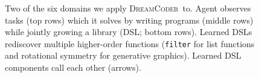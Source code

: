 \documentclass{article}
\newcommand{\system}{\textsc{DreamCoder}~}
\newcommand{\code}[1]{{\footnotesize\texttt{#1}}}
\begin{document}
\begin{figure}
  \caption{Two of the six domains we apply \system to. Agent observes tasks (top rows) which it solves by writing programs (middle rows) while jointly growing a library (DSL; bottom rows). Learned DSLs rediscover multiple higher-order functions (\code{filter} for list functions and rotational symmetry for generative graphics). Learned DSL components call each other (arrows).}  
\end{figure}


\end{document}
